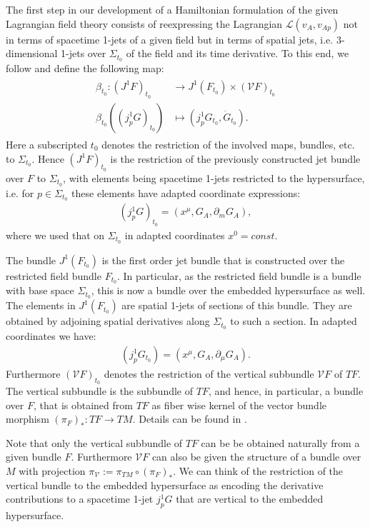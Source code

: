 \documentclass[a4paper,12pt, DIV=14, BCOR=5mm, twoside, headsepline, numbers=noenddot]{scrbook}
\begin{document}
The first step in our development of a Hamiltonian formulation of the given Lagrangian field theory consists of reexpressing the Lagrangian $\mathcal{L}(v_A,v_{Ap})$ not in terms of spacetime 1-jets of a given field but in terms of spatial jets, i.e. 3-dimensional 1-jets over $\Sigma_{t_0}$ of the field and its time derivative. To this end, we follow \cite{2004math.ph..11032G} and define the following map:
\begin{align}
    \begin{aligned}
    \beta_{t_0} : (J^1F)_{t_0} &\longrightarrow J^1(F_{t_0}) \times (\mathcal{V}F)_{t_0} \\
    \beta_{t_0}((j^1_pG)_{t_0}) &\longmapsto (j^1_pG_{t_0}, \dot{G}_{t_0}).
    \end{aligned}
\end{align}
Here a subscripted $t_0$ denotes the restriction of the involved maps, bundles, etc. to $\Sigma_{t_0}$. Hence $(J^1F)_{t_0}$ is the restriction of the previously constructed jet bundle over $F$ to $\Sigma_{t_0}$, with elements being spacetime 1-jets restricted to the hypersurface, i.e. for $p \in \Sigma_{t_0}$ these elements have adapted coordinate expressions: 
\begin{align}
(j^1_pG)_{t_0} = (x^{\mu},G_A,\partial_m G_A),
\end{align}
where we used that on $\Sigma_{t_0}$ in adapted coordinates $x^0=const$. 

The bundle $J^1(F_{t_0})$ is the first order jet bundle that is constructed over the restricted field bundle $F_{t_0}$. In particular, as the restricted field bundle is a bundle with base space $\Sigma_{t_0}$, this is now a bundle over the embedded hypersurface as well. The elements in $J^1(F_{t_0})$ are spatial 1-jets of sections of this bundle. They are obtained by adjoining spatial derivatives along $\Sigma_{t_0}$ to such a section. In adapted coordinates we have: 
\begin{align}
(j^1_pG_{t_0}) = (x^{\mu},G_A,\partial_{\mu} G_A).
\end{align}
Furthermore $(\mathcal{V}F)_{t_0}$ denotes the restriction of the vertical subbundle $\mathcal{V}F$ of $TF$. The vertical subbundle is the subbundle of $TF$, and hence, in particular, a bundle over $F$, that is obtained from $TF$ as fiber wise kernel of the vector bundle morphism $(\pi_F)_{\ast} : TF \rightarrow
TM$. Details can be found in \cite{1998physics...1019G}. 

Note that only the vertical subbundle of $TF$ can be be obtained naturally from a given bundle $F$. Furthermore $\mathcal{V}F$ can also be given the structure of a bundle over $M$ with projection $\pi_{\mathcal{V}}:=\pi_{TM} \circ (\pi_F)_{\ast}$. We can think of the restriction of the vertical bundle to the embedded hypersurface as encoding the derivative contributions to a spacetime 1-jet $j^1_pG$ that are vertical to the embedded hypersurface.
\end{document}
